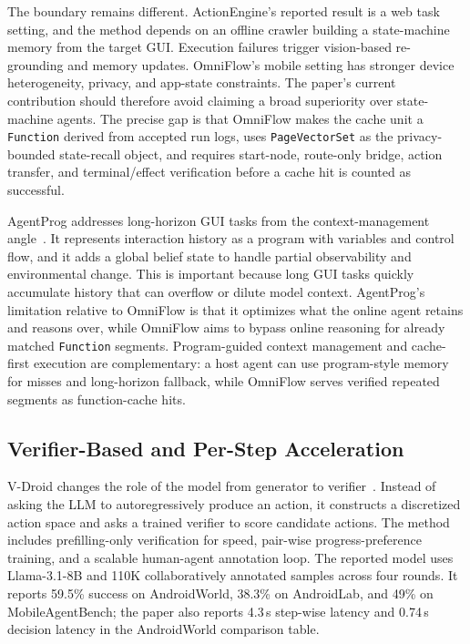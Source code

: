 \documentclass[sigplan,10pt]{acmart}
\newcommand{\sysname}{OmniFlow\xspace}
\begin{document}
The boundary remains different. ActionEngine's reported result is a web task
setting, and the method depends on an offline crawler building a state-machine
memory from the target GUI. Execution failures trigger vision-based re-grounding
and memory updates. \sysname's mobile setting has stronger device heterogeneity,
privacy, and app-state constraints. The paper's current contribution should
therefore avoid claiming a broad superiority over state-machine agents. The
precise gap is that \sysname makes the cache unit a \texttt{Function} derived
from accepted run logs, uses \texttt{PageVectorSet} as the privacy-bounded
state-recall object, and requires start-node, route-only bridge, action
transfer, and terminal/effect verification before a cache hit is counted as
successful.

AgentProg addresses long-horizon GUI tasks from the context-management
angle~\cite{tian2025agentprog}. It represents interaction history as a program
with variables and control flow, and it adds a global belief state to handle
partial observability and environmental change. This is important because long
GUI tasks quickly accumulate history that can overflow or dilute model context.
AgentProg's limitation relative to \sysname is that it optimizes what the online
agent retains and reasons over, while \sysname aims to bypass online reasoning
for already matched \texttt{Function} segments. Program-guided context
management and cache-first execution are complementary: a host agent can use
program-style memory for misses and long-horizon fallback, while \sysname serves
verified repeated segments as function-cache hits.

\subsection{Verifier-Based and Per-Step Acceleration}

V-Droid changes the role of the model from generator to
verifier~\cite{dai2025advancing}. Instead of asking the LLM to
autoregressively produce an action, it constructs a discretized action space and
asks a trained verifier to score candidate actions. The method includes
prefilling-only verification for speed, pair-wise progress-preference training,
and a scalable human-agent annotation loop. The reported model uses
Llama-3.1-8B and 110K collaboratively annotated samples across four rounds. It
reports 59.5\% success on AndroidWorld, 38.3\% on AndroidLab, and 49\% on
MobileAgentBench; the paper also reports 4.3\,s step-wise latency and 0.74\,s
decision latency in the AndroidWorld comparison table.
\end{document}
